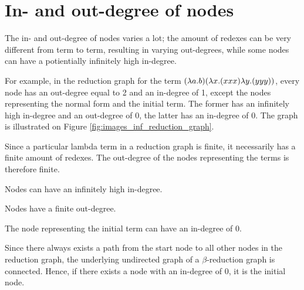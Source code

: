 \section{In- and out-degree of nodes}

The in- and out-degree of nodes varies a lot; the amount of redexes can be
very different from term to term, resulting in varying out-degrees, while some
nodes can have a potientially infinitely high in-degree.

For example, in the reduction graph for the term $(\lambda a.b) (\lambda x.(xxx)
\lambda y.(yyy))$, every node has an out-degree equal to 2 and an in-degree of
1, except the nodes representing the normal form and the initial term. The
former has an infinitely high in-degree and an out-degree of 0, the latter has
an in-degree of 0. The graph is illustrated on Figure \ref{fig:images_inf_reduction_graph}.

Since a particular lambda term in a reduction graph is finite, it necessarily has
a finite amount of redexes. The out-degree of the nodes representing the terms
is therefore finite.



\fact Nodes can have an infinitely high in-degree.

\fact Nodes have a finite out-degree.

\fact The node representing the initial term can have an in-degree of 0.

\fact Since there always exists a path from the start node to all other nodes
in the reduction graph, the underlying undirected graph of a $\beta$-reduction
graph is connected. Hence, if there exists a node with an in-degree of 0, it
is the initial node.

